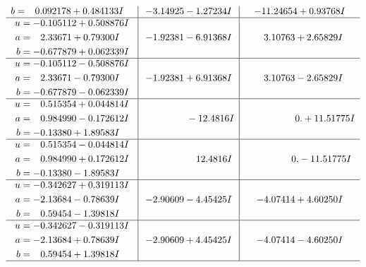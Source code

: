 \documentclass[1p]{elsarticle_modified}
\theoremstyle{definition}
\begin{document}
$$\begin{array}{c|c|c}
\begin{aligned}
b &= \phantom{-}0.092178 + 0.484133 I\end{aligned}
 & -3.14925 - 1.27234 I & -11.24654 + 0.93768 I \\ \hline\begin{aligned}
u &= -0.105112 + 0.508876 I \\
a &= \phantom{-}2.33671 + 0.79300 I \\
b &= -0.677879 + 0.062339 I\end{aligned}
 & -1.92381 - 6.91368 I & \phantom{-}3.10763 + 2.65829 I \\ \hline\begin{aligned}
u &= -0.105112 - 0.508876 I \\
a &= \phantom{-}2.33671 - 0.79300 I \\
b &= -0.677879 - 0.062339 I\end{aligned}
 & -1.92381 + 6.91368 I & \phantom{-}3.10763 - 2.65829 I \\ \hline\begin{aligned}
u &= \phantom{-}0.515354 + 0.044814 I \\
a &= \phantom{-}0.984990 - 0.172612 I \\
b &= -0.13380 + 1.89583 I\end{aligned}
 & \phantom{-0.000000 } -12.4816 I & \phantom{-0.000000 -}0. + 11.51775 I \\ \hline\begin{aligned}
u &= \phantom{-}0.515354 - 0.044814 I \\
a &= \phantom{-}0.984990 + 0.172612 I \\
b &= -0.13380 - 1.89583 I\end{aligned}
 & \phantom{-0.000000 -}12.4816 I & \phantom{-0.000000 } 0. - 11.51775 I \\ \hline\begin{aligned}
u &= -0.342627 + 0.319113 I \\
a &= -2.13684 - 0.78639 I \\
b &= \phantom{-}0.59454 - 1.39818 I\end{aligned}
 & -2.90609 - 4.45425 I & -4.07414 + 4.60250 I \\ \hline\begin{aligned}
u &= -0.342627 - 0.319113 I \\
a &= -2.13684 + 0.78639 I \\
b &= \phantom{-}0.59454 + 1.39818 I\end{aligned}
 & -2.90609 + 4.45425 I & -4.07414 - 4.60250 I\\
 \hline 
 \end{array}$$\newpage$$\begin{array}{c|c|c}  

\end{array}$$
\end{document}
